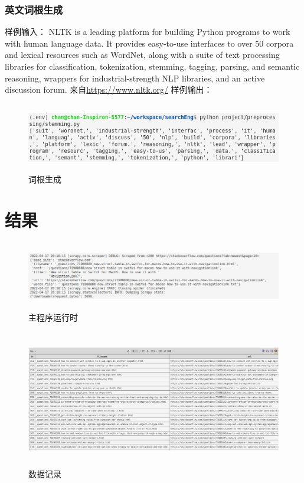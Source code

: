 \documentclass{article}
\begin{document}
\begin{CJK*}{UTF8}{gbsn}
\subsubsection{英文词根生成}
样例输入：\newline
NLTK is a leading platform for building Python programs to work with human language data. It provides easy-to-use interfaces to over 50 corpora and lexical resources such as WordNet, along with a suite of text processing libraries for classification, tokenization, stemming, tagging, parsing, and semantic reasoning, wrappers for industrial-strength NLP libraries, and an active discussion forum.
来自\url{https://www.nltk.org/}
\newline
样例输出：\newline
\begin{figure}[H]
\centering
\includegraphics[height=3cm]{en_stem_result.png}
\caption{词根生成}
\end{figure}

\section{结果}
\begin{figure}[H]
\centering
\includegraphics[height=3cm]{result.png}
\caption{主程序运行时}
\end{figure}

\begin{figure}[H]
\centering
\includegraphics[height=6cm]{query_result.png}
\caption{数据记录}
\end{figure}


\end{CJK*}
\end{document}
